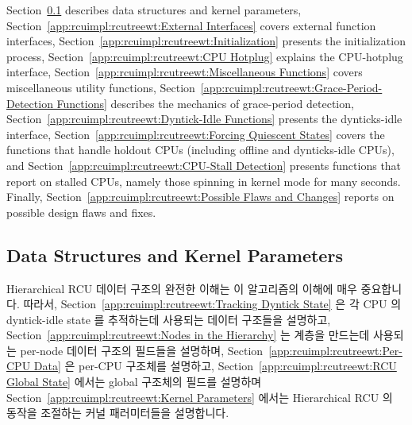 Section~\ref{app:rcuimpl:rcutreewt:Data Structures and Kernel Parameters}
describes data structures and kernel parameters,
Section~\ref{app:rcuimpl:rcutreewt:External Interfaces}
covers external function interfaces,
Section~\ref{app:rcuimpl:rcutreewt:Initialization}
presents the initialization process,
Section~\ref{app:rcuimpl:rcutreewt:CPU Hotplug}
explains the CPU-hotplug interface,
Section~\ref{app:rcuimpl:rcutreewt:Miscellaneous Functions}
covers miscellaneous utility functions,
Section~\ref{app:rcuimpl:rcutreewt:Grace-Period-Detection Functions}
describes the mechanics of grace-period detection,
Section~\ref{app:rcuimpl:rcutreewt:Dyntick-Idle Functions}
presents the dynticks-idle interface,
Section~\ref{app:rcuimpl:rcutreewt:Forcing Quiescent States}
covers the functions that handle holdout CPUs (including offline and
dynticks-idle CPUs), and
Section~\ref{app:rcuimpl:rcutreewt:CPU-Stall Detection}
presents functions that report on stalled CPUs, namely those spinning
in kernel mode for many seconds.
Finally,
Section~\ref{app:rcuimpl:rcutreewt:Possible Flaws and Changes}
reports on possible design flaws and fixes.
\fi

\subsection{Data Structures and Kernel Parameters}
\label{app:rcuimpl:rcutreewt:Data Structures and Kernel Parameters}

Hierarchical RCU 데이터 구조의 완전한 이해는 이 알고리즘의 이해에 매우
중요합니다.
따라서,
Section~\ref{app:rcuimpl:rcutreewt:Tracking Dyntick State}
은 각 CPU 의 dyntick-idle state 를 추적하는데 사용되는 데이터 구조들을
설명하고,
Section~\ref{app:rcuimpl:rcutreewt:Nodes in the Hierarchy}
는  계층을 만드는데 사용되는 per-node 데이터 구조의 필드들을
설명하며,
Section~\ref{app:rcuimpl:rcutreewt:Per-CPU Data}
은 per-CPU  구조체를 설명하고,
Section~\ref{app:rcuimpl:rcutreewt:RCU Global State}
에서는 global  구조체의 필드를 설명하며
Section~\ref{app:rcuimpl:rcutreewt:Kernel Parameters}
에서는 Hierarchical RCU 의 동작을 조절하는 커널 패러미터들을 설명합니다.
\iffalse

A full understanding of the Hierarchical RCU data structures is
critically important to understanding the algorithms.
To this end,
Section~\ref{app:rcuimpl:rcutreewt:Tracking Dyntick State}
describes the data structures used to track each CPU's dyntick-idle state,
Section~\ref{app:rcuimpl:rcutreewt:Nodes in the Hierarchy}
describes the fields in the per-node data structure making up the
\co{rcu_node} hierarchy,
Section~\ref{app:rcuimpl:rcutreewt:Per-CPU Data}
describes per-CPU \co{rcu_data} structure,
Section~\ref{app:rcuimpl:rcutreewt:RCU Global State}
describes the field in the global \co{rcu_state} structure,
and
Section~\ref{app:rcuimpl:rcutreewt:Kernel Parameters}
describes the kernel parameters that control Hierarchical RCU's
operation.
\fi

